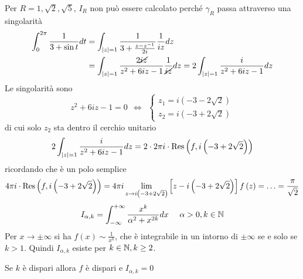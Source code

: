 Per $R = 1,\sqrt{2} ,\sqrt{5}$, $I_{R}$ non può essere calcolato perché $\gamma _{R}$ passa attraverso una singolarità
\Soluzione
\begin{align*}
\int ^{2\pi }_{0}\frac{1}{3 + \sin t} dt & = \int _{\left| z\right| = 1}\frac{1}{3 + \frac{z - z^{ - 1}}{2i}}\frac{1}{iz} dz\\
 & = \int _{\left| z\right| = 1}\frac{2\cancel{iz}}{z^{2} + 6iz - 1}\frac{1}{\cancel{iz}} dz = 2\int _{\left| z\right| = 1}\frac{i}{z^{2} + 6iz - 1} dz
\end{align*}
Le singolarità sono
\begin{equation*}
z^{2} + 6iz - 1 = 0\ \ \iff \ \ \begin{cases}
z_{1} = i\left(- 3 - 2\sqrt{2}\right)\\
z_{2} = i\left(- 3 + 2\sqrt{2}\right)
\end{cases}
\end{equation*}
di cui solo $z_{2}$ sta dentro il cerchio unitario
\begin{equation*}
2\int _{\left| z\right| = 1}\frac{i}{z^{2} + 6iz - 1} dz = 2\cdot 2\pi i\cdot \operatorname{Res} \left(f,i\left(- 3 + 2\sqrt{2}\right)\right)
\end{equation*}
ricordando che è un polo semplice
\begin{equation*}
4\pi i\cdot \operatorname{Res} \left(f,i\left(- 3 + 2\sqrt{2}\right)\right) = 4\pi i\lim\limits _{z\rightarrow i\left(- 3 + 2\sqrt{2}\right)}\left[ z - i\left(- 3 + 2\sqrt{2}\right)\right] f\left(z\right) = \dotsc = \frac{\pi }{\sqrt{2}}
\end{equation*}
\Soluzione
\begin{equation*}
I_{\alpha ,k} = \int ^{ + \infty }_{ - \infty }\frac{x^{k}}{\alpha ^{2} + x^{2k}} dx\ \ \ \ \alpha  > 0,k\in \NN 
\end{equation*}
Per $x\rightarrow \pm \infty $ si ha $f\left(x\right) \sim \frac{1}{x^{k}}$, che è integrabile in un intorno di $\pm \infty $ se e solo se $k > 1$. Quindi $I_{\alpha ,k}$ esiste per $k\in \mathbb{N}  ,k\geq 2$.

Se $k$ è dispari allora $f$ è dispari e $I_{\alpha ,k} = 0$

